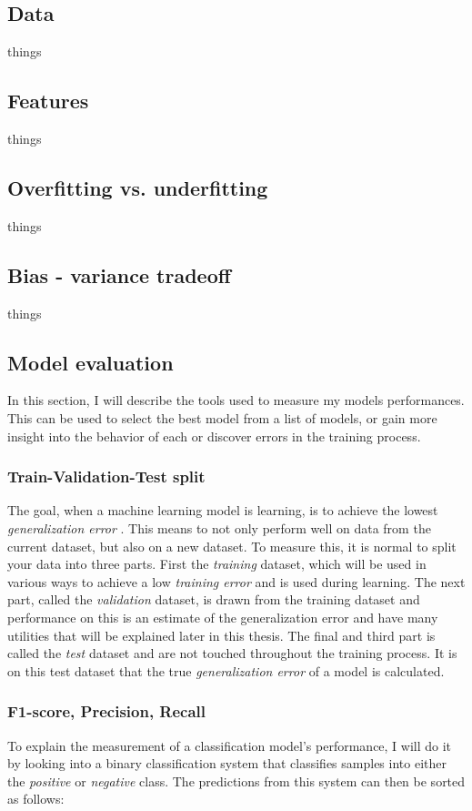     \subsection{Data}
        things
    \subsection{Features}
        things
    \subsection{Overfitting vs. underfitting}
        things
    \subsection{Bias - variance tradeoff}
        things
        
    \subsection{Model evaluation}
        In this section, I will describe the tools used to measure my models performances. This can be used to select the best model from a list of models, or gain more insight into the behavior of each or discover errors in the training process.
    \subsubsection{Train-Validation-Test split}
        The goal, when a machine learning model is learning, is to achieve the lowest \textit{generalization error} \cite{Goodfellow-et-al-2016_generalization}. This means to not only perform well on data from the current dataset, but also on a new dataset. To measure this, it is normal to split your data into three parts\cite{Goodfellow-et-al-2016_train_val_test_split}. First the \textit{training} dataset, which will be used in various ways to achieve a low \textit{training error} and is used during learning. The next part, called the \textit{validation} dataset, is drawn from the training dataset and performance on this is an estimate of the generalization error and have many utilities that will be explained later in this thesis. The final and third part is called the \textit{test} dataset and are not touched throughout the training process. It is on this test dataset that the true \textit{generalization error} of a model is calculated. 
    \subsubsection{F1-score, Precision, Recall} \label{f1_score}
        To explain the measurement of a classification model's performance, I will do it by looking into a binary classification system that classifies samples into either the \textit{positive} or \textit{negative} class\cite{powers2020evaluation_f1_recall_precision}. The predictions from this system can then be sorted as follows:
        
